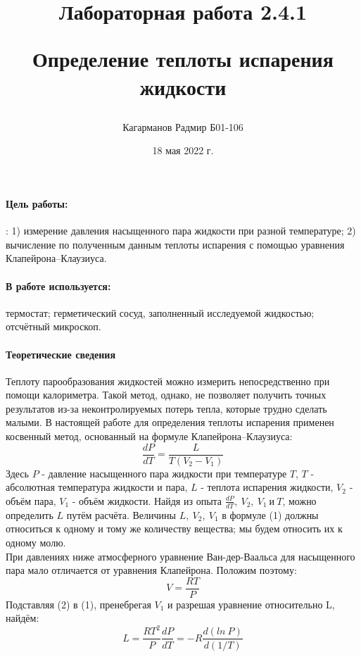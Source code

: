 \documentclass[a4paper,12pt]{article}
\title{Лабораторная работа 2.4.1 

Определение теплоты испарения жидкости}
\author{Кагарманов Радмир Б01-106}
\date{18 мая 2022 г.}
\begin{document}
\maketitle
\thispagestyle{empty}
\newpage
\setcounter{page}{1}
\paragraph{Цель работы:}: 1) измерение давления насыщенного пара жидкости
при разной температуре; 2) вычисление по полученным данным теплоты испарения с помощью уравнения Клапейрона–Клаузиуса.
\paragraph{В работе используется:}термостат; герметический сосуд, заполненный исследуемой жидкостью; отсчётный микроскоп.
\paragraph{Теоретические сведения\\}
Теплоту парообразования жидкостей можно измерить непосредственно при помощи калориметра. Такой метод, однако, не позволяет
получить точных результатов из-за неконтролируемых потерь тепла,
которые трудно сделать малыми. В настоящей работе для определения
теплоты испарения применен косвенный метод, основанный на формуле
Клапейрона–Клаузиуса:
\begin{equation}
    \frac{dP}{dT}=\frac{L}{T(V_2-V_1)}
\end{equation}
Здесь $P$ - давление насыщенного пара жидкости при температуре $T$, $T$ - абсолютная температура жидкости и пара, $L$ - теплота испарения жидкости, $V_2$ - объём пара, $V_1$ - объём жидкости. Найдя из опыта $\frac{dP}{dT}, ~V_2, ~V_1~ и ~T$, можно определить $L$ путём расчёта. Величины $L, ~V_2, ~V_1$ в формуле (1) должны относиться к одному и тому же количеству
вещества; мы будем относить их к одному молю. \\
При давлениях ниже атмосферного уравнение Ван-дер-Ваальса для насыщенного пара мало отличается от уравнения Клапейрона. Положим
поэтому:
\begin{equation}
    V=\frac{RT}{P}
\end{equation}
Подставляя (2) в (1), пренебрегая $V_1$ и разрешая уравнение относительно L, найдём:
\begin{equation}
    L=\frac{RT^2}{P}\frac{dP}{dT}=-R\frac{d(ln ~P)}{d(1/T)}
\end{equation}
\end{document}
